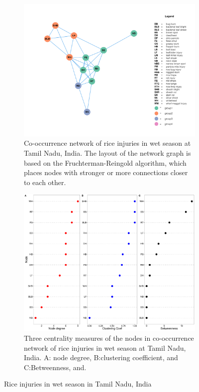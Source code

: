 \begin{figure}
    \centering
    \begin{subfigure}[b]{1\textwidth}
        \includegraphics[width = 1\textwidth]{figures/networkTM_ws/networkTM_ws.pdf}
        \caption{Co-occurrence network of rice injuries in wet season at Tamil Nadu, India. The layout of the network graph is based on the Fruchterman-Reingold algorithm, which places nodes with stronger or more connections closer to each other.}
        \label{fig:networkTM_ws}
    \end{subfigure}
    \begin{subfigure}[b]{1\textwidth}
        \includegraphics[width = 1\textwidth]{figures/nodepropTM_ws/nodepropTM_ws.pdf}
        \caption{Three centrality measures of the nodes in co-occurrence network of rice injuries in wet season at Tamil Nadu, India. A: node degree, B:clustering coefficient, and C:Betweenness, and.}
        \label{fig:nodepropTM_ws}
    \end{subfigure}
    \caption{Rice injuries in wet season in Tamil Nadu, India}
    \label{fig:TM_ws}
\end{figure}

